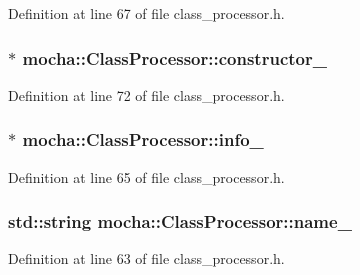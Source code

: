 Definition at line 67 of file class\_\-processor.h.

\hypertarget{classmocha_1_1_class_processor_a58b2732fd5cca6a818c342585c67aff6}{
\subsubsection[{constructor\_\-}]{$\ast$ {\bf mocha::ClassProcessor::constructor\_\-}}}
\label{classmocha_1_1_class_processor_a58b2732fd5cca6a818c342585c67aff6}


Definition at line 72 of file class\_\-processor.h.

\hypertarget{classmocha_1_1_class_processor_a4306a92ebfbd33320b8a485b0c420f27}{
\subsubsection[{info\_\-}]{$\ast$ {\bf mocha::ClassProcessor::info\_\-}}}
\label{classmocha_1_1_class_processor_a4306a92ebfbd33320b8a485b0c420f27}


Definition at line 65 of file class\_\-processor.h.

\hypertarget{classmocha_1_1_class_processor_a6cee088c1f255c143fcba53994102461}{
\subsubsection[{name\_\-}]{\setlength{\rightskip}{0pt plus 5cm}std::string {\bf mocha::ClassProcessor::name\_\-}}}
\label{classmocha_1_1_class_processor_a6cee088c1f255c143fcba53994102461}


Definition at line 63 of file class\_\-processor.h.

